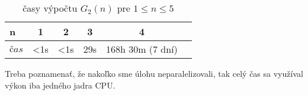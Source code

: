 \begin{table}[H]
  \centering
  \begin{tabular}{|l|c|c|c|c|r|}
    \hline
    n & 1 & 2 & 3 & 4 \\ 
    \hline
    $čas$ & <1s & <1s & 29s & 168h 30m (7 dní) \\ 
    \hline
  \end{tabular}
  \caption{časy výpočtu $G_2(n)$ pre $1 \leq n \leq 5$}
\end{table}

Treba poznamenať, že nakoľko sme úlohu neparalelizovali, tak celý čas sa využíval výkon iba jedného jadra CPU.